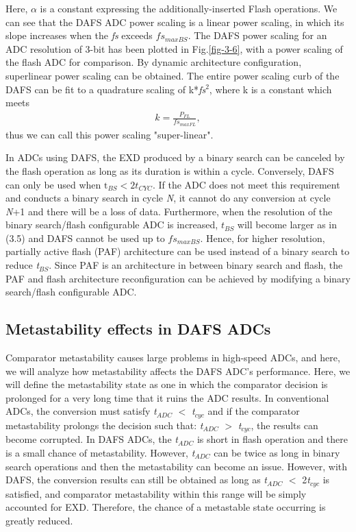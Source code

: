 Here, $\alpha$ is a constant expressing the additionally-inserted Flash operations. We can see that the DAFS ADC power scaling is a linear power scaling, in which its slope increases when the \textit{fs} exceeds $fs{}_{maxBS}$. The DAFS power scaling for an ADC resolution of 3-bit has been plotted in Fig.\ref{fig-3-6}, with a power scaling of the flash ADC for comparison. By dynamic architecture configuration, superlinear power scaling can be obtained. The entire power scaling curb of the DAFS can be fit to a quadrature scaling of k*\textit{fs}${}^{2}$, where k is a constant which meets
\begin{eqnarray}
k=\frac{{{P}}_{{FL}}}{{fs}_{maxFL}},
\end{eqnarray}
thus we can call this power scaling "super-linear".

In ADCs using DAFS, the EXD produced by a binary search can be canceled by the flash operation as long as its duration is within a cycle. Conversely, DAFS can only be used when ${\mathrm{t}}_{BS}<2t_{CYC}$. If the ADC does not meet this requirement and conducts a binary search in cycle \textit{N}, it cannot do any conversion at cycle \textit{N}+1 and there will be a loss of data. Furthermore, when the resolution of the binary search/flash configurable ADC is increased, \textit{$t_{BS}$} will become larger as in (3.5) and DAFS cannot be used up to \textit{$fs_{maxBS}$}. Hence, for higher resolution, partially active flash (PAF) architecture \cite{paf-adc} can be used instead of a binary search to reduce \textit{t${}_{BS}$}. Since PAF is an architecture in between binary search and flash, the PAF and flash architecture reconfiguration can be achieved by modifying a binary search/flash configurable ADC.

\subsection{Metastability effects in DAFS ADCs}

Comparator metastability causes large problems in high-speed ADCs, and here, we will analyze how metastability affects the DAFS ADC's performance. 
Here, we will define the metastability state as one in which the comparator decision is prolonged for a very long time that it ruins the ADC results. In conventional ADCs, the conversion must satisfy \textit{t${}_{ADC}$} $\mathrm{<}$ \textit{t${}_{cyc}$} and if the comparator metastability prolongs the decision such that: \textit{t${}_{ADC}$} $\mathrm{>}$ \textit{t${}_{cyc}$}, the results can become corrupted. In DAFS ADCs, the \textit{t${}_{ADC}$} is short in flash operation and there is a small chance of metastability. However, \textit{t${}_{ADC}$} can be twice as long in binary search operations and then the metastability can become an issue. However, with DAFS, the conversion results can still be obtained as long as \textit{t${}_{ADC}$} $\mathrm{<}$ 2\textit{t${}_{cyc}$} is satisfied, and comparator metastability within this range will be simply accounted for EXD. Therefore, the chance of a metastable state occurring is greatly reduced. 


